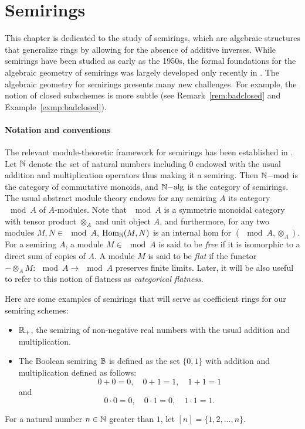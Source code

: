 \chapter{Semirings}

This chapter is dedicated to the study of semirings, which are algebraic structures that generalize rings by 
allowing for the absence of additive inverses. While semirings have been studied as early as the 1950s, 
the formal foundations for the algebraic geometry of semirings was largely developed only recently in \cite{borgersemi}.
The algebraic geometry for semirings presents many new challenges. For example, the notion of closed subschemes
is more subtle (see Remark~\ref{rem:badclosed} and Example~\ref{exmp:badclosed}).

\subsubsection*{Notation and conventions} The relevant module-theoretic framework for semirings has been established in \cite{borgersemi}.  
Let $\mathbb{N}$ denote the set of natural numbers including $0$ endowed with the usual addition and multiplication operators thus making
it a semiring. Then ${\mathbb{N}}\mathrm{-mod}$ is the category of commutative monoids, and ${\mathbb{N}}\mathrm{-alg}$ is the category of semirings. The usual
abstract module theory endows for any semiring $A$ its category $\mod{A}$ of $A$-modules.
Note that $\mod{A}$ is a symmetric monoidal category with tensor product $\otimes_A$ and unit object $A$, 
and furthermore, for any two modules $M,N \in \mod{A}$, $\operatorname{Hom}_{\mathbb{N}}(M,N)$ is an internal hom for $(\mod{A},\otimes_{A})$.\\
\indent For a semiring $A$, a module $M \in \mod{A}$ is said to be \textit{free} if it is isomorphic to a direct sum of copies of $A$.
A module $M$ is said to be \textit{flat} if the functor $-\otimes_A M:\mod{A} \to \mod{A}$ preserves finite limits. Later, it will be 
also useful to refer to this notion of flatness as \textit{categorical flatness}.

\begin{example}
Here are some examples of semirings that will serve as coefficient rings for our semiring schemes:
\begin{itemize}
\item $\mathbb{R}_{+}$, the semiring of non-negative real numbers with the usual addition and multiplication.
\item The Boolean semiring $\mathbb{B}$ is defined as the set $\{0,1\}$ with addition and multiplication defined as follows:
\[0+0=0, \quad 0+1=1, \quad 1+1=1\]
and
\[0\cdot 0=0, \quad 0\cdot 1=0, \quad 1\cdot 1=1.\]
\end{itemize}
\end{example}
For a natural number $n \in \mathbb{N}$ greater than $1$, let $[n]=\{1,2,...,n\}$.

